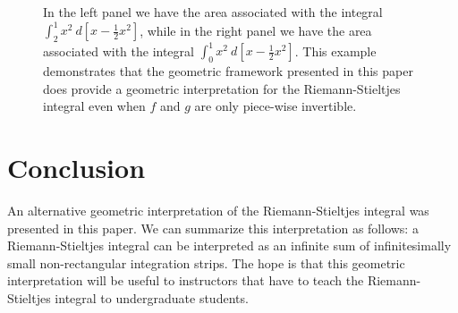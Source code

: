 \documentclass{article}
\theoremstyle{theorem}
\theoremstyle{definition}
\begin{document}
\begin{figure}
\begin{minipage}{.5\textwidth}
\end{minipage}
\caption{In the left panel we have the area associated with the integral $\int_2^1 x^2~d[x-\frac{1}{2}x^2]$, while in the 
right panel we have the area associated with the integral $\int_0^1 x^2~d[x-\frac{1}{2}x^2]$. This example demonstrates
that the geometric framework presented in this paper does provide a geometric interpretation for the Riemann-Stieltjes integral
even when $f$ and $g$ are only piece-wise invertible.}
\label{fig:ex4_sec}
\end{figure}

\section{Conclusion}
An alternative geometric interpretation of the Riemann-Stieltjes integral was presented in this paper. We can summarize this 
interpretation as follows: a Riemann-Stieltjes integral can be interpreted as an infinite sum of infinitesimally small non-rectangular 
integration strips. The hope is that this geometric interpretation will be useful to instructors that have to teach
the Riemann-Stieltjes integral to undergraduate students. 
\end{document}
